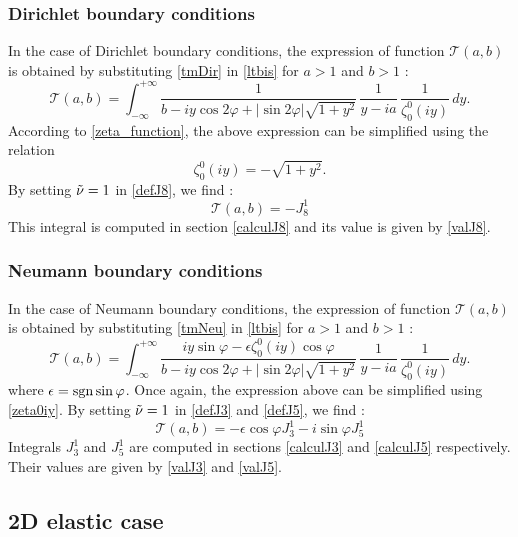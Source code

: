 \subsubsection{Dirichlet boundary conditions}
\label{finalTacDir}
In the case of Dirichlet boundary conditions, the expression of function $\mathcal{T}(a,b)$ is obtained by substituting \eqref{tmDir} in \eqref{ltbis} for $a>1$ and $b>1$ :
\begin{equation}
\mathcal{T}(a,b) = \int_{-\infty}^{+\infty} \dfrac{1}{ b - iy \cos 2\varphi  + |\sin 2\varphi| \sqrt{1+y^2}} \, \dfrac{1}{y -i a} \,\dfrac{1}{\zeta_0^0(iy)} \, dy . 
\end{equation}
According to \eqref{zeta_function}, the above expression can be simplified using the relation
\begin{equation}
\zeta_0^0(iy)= - \sqrt{1+y^2}.
\label{zeta0iy}
\end{equation}
By setting $\tilde{\nu}=1$ in \eqref{defJ8}, we find :
\begin{equation}
\mathcal{T}(a,b)=-J_8^1
\end{equation}
This integral is computed in section \ref{calculJ8} and its value is given by \eqref{valJ8}.
\subsubsection{Neumann boundary conditions}
\label{finalTacNeu}
In the case of Neumann boundary conditions, the expression of function $\mathcal{T}(a,b)$ is obtained by substituting \eqref{tmNeu} in \eqref{ltbis} for $a>1$ and $b>1$ :
\begin{equation}
\mathcal{T}(a,b) = \int_{-\infty}^{+\infty} \dfrac{iy\sin\varphi-\epsilon\zeta_0^0(iy)\cos\varphi}{ b - iy \cos 2\varphi  + |\sin 2\varphi| \sqrt{1+y^2}} \, \dfrac{1}{y -i a} \,\dfrac{1}{\zeta_0^0(iy)} \, dy .
\end{equation}
where $\epsilon= \rm sgn \sin\varphi$. Once again, the expression above can be simplified using \eqref{zeta0iy}. By setting $\tilde{\nu}=1$ in \eqref{defJ3} and \eqref{defJ5}, we find :
\begin{equation}
\mathcal{T}(a,b)=-\epsilon\cos\varphi J_3^1-i\sin\varphi J_5^1
\end{equation}
Integrals $J_3^1$ and $J_5^1$ are computed in sections \ref{calculJ3} and \ref{calculJ5} respectively. Their values are given by \eqref{valJ3} and \eqref{valJ5}.

\subsection{2D elastic case}
\label{finalT2D}
